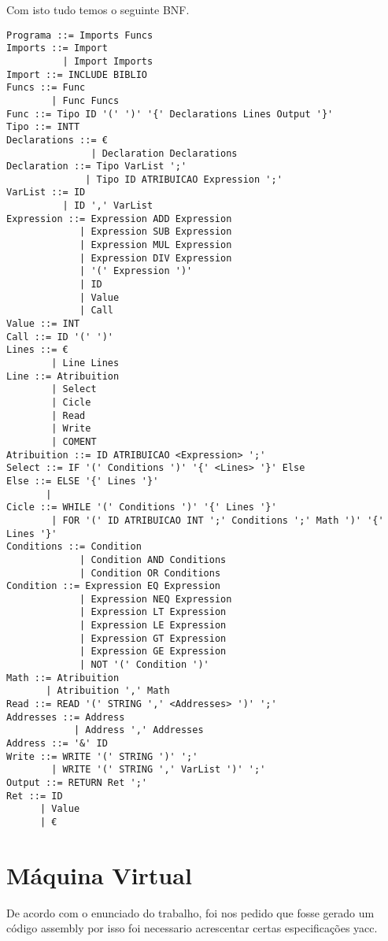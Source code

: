 \documentclass[12pt,a4paper]{report}
\begin{document}
 
Com isto tudo temos o seguinte BNF.

\begin{lstlisting}
Programa ::= Imports Funcs
Imports ::= Import
          | Import Imports
Import ::= INCLUDE BIBLIO
Funcs ::= Func
        | Func Funcs
Func ::= Tipo ID '(' ')' '{' Declarations Lines Output '}'
Tipo ::= INTT
Declarations ::= €
               | Declaration Declarations
Declaration ::= Tipo VarList ';'
              | Tipo ID ATRIBUICAO Expression ';'
VarList ::= ID
          | ID ',' VarList
Expression ::= Expression ADD Expression
             | Expression SUB Expression
             | Expression MUL Expression
             | Expression DIV Expression
             | '(' Expression ')'
             | ID
             | Value
             | Call
Value ::= INT
Call ::= ID '(' ')'
Lines ::= €
        | Line Lines
Line ::= Atribuition
        | Select
        | Cicle
        | Read
        | Write
        | COMENT
Atribuition ::= ID ATRIBUICAO <Expression> ';'
Select ::= IF '(' Conditions ')' '{' <Lines> '}' Else
Else ::= ELSE '{' Lines '}'
       | 
Cicle ::= WHILE '(' Conditions ')' '{' Lines '}'
        | FOR '(' ID ATRIBUICAO INT ';' Conditions ';' Math ')' '{' Lines '}'
Conditions ::= Condition
             | Condition AND Conditions
             | Condition OR Conditions
Condition ::= Expression EQ Expression
             | Expression NEQ Expression
             | Expression LT Expression
             | Expression LE Expression
             | Expression GT Expression
             | Expression GE Expression
             | NOT '(' Condition ')'
Math ::= Atribuition
       | Atribuition ',' Math
Read ::= READ '(' STRING ',' <Addresses> ')' ';'
Addresses ::= Address
            | Address ',' Addresses
Address ::= '&' ID
Write ::= WRITE '(' STRING ')' ';'
        | WRITE '(' STRING ',' VarList ')' ';'
Output ::= RETURN Ret ';'
Ret ::= ID
      | Value
      | €
\end{lstlisting}
\section{Máquina Virtual}
De acordo com o enunciado do trabalho, foi nos pedido que fosse gerado um código assembly por isso foi necessario acrescentar certas especificações yacc.
\end{document}
